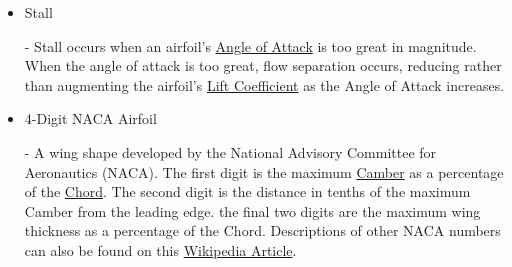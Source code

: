 \documentclass{article}
\begin{document}
\begin{itemize}
	\item \hypertarget{ST}{Stall} - Stall occurs when an airfoil's \hyperlink{alpha}{Angle of Attack} is too great in magnitude. When the angle of attack is too great, flow separation occurs, reducing rather than augmenting the airfoil's \hyperlink{CL}{Lift Coefficient} as the Angle of Attack increases.
		
	\item \hypertarget{NACA}{4-Digit NACA Airfoil} - A wing shape developed by the National Advisory Committee for Aeronautics (NACA). The first digit is the maximum \hyperlink{Camber}{Camber} as a percentage of the \hyperlink{c}{Chord}. The second digit is the distance in tenths of the maximum Camber from the leading edge. the final two digits are the maximum wing thickness as a percentage of the Chord. Descriptions of other NACA numbers can also be found on this \href{https://en.wikipedia.org/wiki/NACA_airfoil}{Wikipedia Article}. 
	
\end{itemize}
\end{document}
